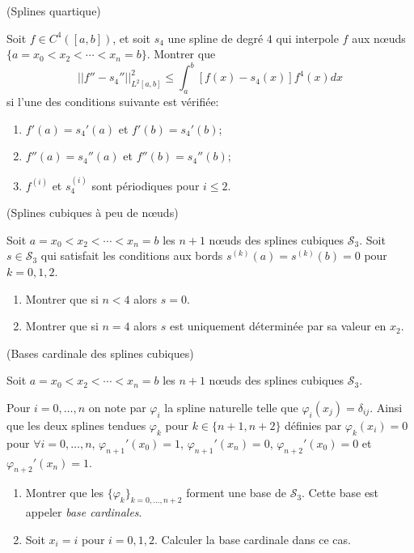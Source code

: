 \documentclass[a4paper,12pt,reqno]{amsart}
\begin{document}
\begin{exo} (Splines quartique)

  Soit $f \in C^{4}([a,b])$, et soit $s_{4}$ une spline de degré $4$ qui interpole $f$ aux nœuds $\{a=x_{0}<x_{2}<\cdots<x_{n}=b\}$. Montrer que
      $$
        ||f''-s_{4}'' ||_{L^{2}[a,b]}^{2} \leq \int_{a}^{b} [f(x)-s_{4}(x)]f^{4}(x) dx
      $$
    si l'une des conditions suivante est vérifiée:
    \begin{enumerate}
      \item $f'(a)=s_{4}'(a)$ et $f'(b)=s_{4}'(b)$;
      \item $f''(a)=s_{4}''(a)$ et $f''(b)=s_{4}''(b)$;
      \item $f^{(i)}$ et $s_{4}^{(i)}$ sont périodiques pour $i \leq 2$.
    \end{enumerate}
\end{exo}

\begin{exo} (Splines cubiques à peu de nœuds)

  Soit $a=x_{0}<x_{2}<\cdots<x_{n}=b$ les $n+1$ nœuds des splines cubiques $\mathcal{S}_{3}$. Soit $s \in \mathcal{S}_{3}$ qui satisfait les conditions aux bords $s^{(k)}(a)=s^{(k)}(b)=0$ pour $k=0,1,2$.
  \begin{enumerate}
    \item Montrer que si $n < 4$ alors $s=0$.

    \item Montrer que si $n=4$ alors $s$ est uniquement déterminée par sa valeur en $x_{2}$.
  \end{enumerate}

\end{exo}

\begin{exo} (Bases cardinale des splines cubiques)

  Soit $a=x_{0}<x_{2}<\cdots<x_{n}=b$ les $n+1$ nœuds des splines cubiques $\mathcal{S}_{3}$.

  Pour $i=0,\ldots,n$ on note par $\varphi_{i}$ la spline naturelle telle que $\varphi_{i}(x_{j})=\delta_{ij}$. Ainsi que les deux splines tendues $\varphi_{k}$ pour $k \in \{n+1,n+2\}$ définies par $\varphi_{k}(x_{i})=0$ pour $\forall i=0,\ldots,n$, $\varphi_{n+1}'(x_{0})=1$, $\varphi_{n+1}'(x_{n})=0$, $\varphi_{n+2}'(x_{0})=0$ et $\varphi_{n+2}'(x_{n})=1$.
  \begin{enumerate}
    \item Montrer que les $\{\varphi_{k}\}_{k=0,\ldots,n+2}$ forment une base de $\mathcal{S}_{3}$.\newline
    Cette base est appeler \emph{base cardinales}.
    \item Soit $x_{i}=i$ pour $i=0,1,2$. Calculer la base cardinale dans ce cas.
  \end{enumerate}
\end{exo}
\end{document}
